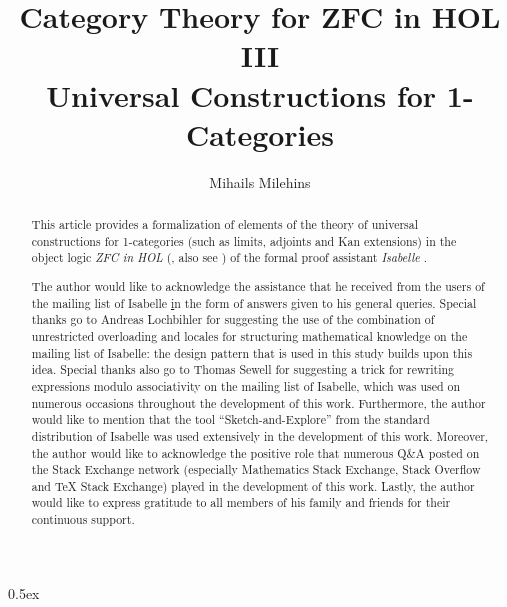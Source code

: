 \documentclass[11pt,a4paper,fleqn]{article}
\begin{document}
\title{Category Theory for ZFC in HOL III\\Universal Constructions for 1-Categories} 
\author{Mihails Milehins}
\maketitle

\newpage
\begin{abstract}
This article provides a formalization of elements of the theory of
universal constructions for 1-categories (such as limits,
adjoints and Kan extensions) in the object logic \textit{ZFC in HOL} 
(\cite{paulson_zermelo_2019}, also see \cite{barkaoui_partizan_2006}) of the 
formal proof assistant \textit{Isabelle} \cite{paulson_natural_1986}.
\end{abstract}

\newpage

\renewcommand{\abstractname}{Acknowledgements}
\begin{abstract}
The author would like to acknowledge the assistance that he received from 
the users of the mailing list of Isabelle 
\href{https://lists.cam.ac.uk/mailman/listinfo/cl-isabelle-users}
in the form of answers given to his general queries. Special thanks
go to Andreas Lochbihler for suggesting the use of the combination 
of unrestricted overloading and locales for structuring mathematical 
knowledge on the mailing list of Isabelle: the design pattern that is 
used in this study builds upon this idea. Special thanks also go to
Thomas Sewell for suggesting a trick for rewriting 
expressions modulo associativity on the mailing list of Isabelle,
which was used on numerous occasions throughout the development
of this work. Furthermore, the author
would like to mention that the tool ``Sketch-and-Explore''
\cite{haftmann_sketch-and-explore_2021}
from the standard distribution of Isabelle was used extensively in the
development of this work. Moreover, the author would like 
to acknowledge the positive role that numerous Q\&A posted on the 
Stack Exchange network (especially Mathematics Stack Exchange, 
Stack Overflow and TeX Stack Exchange)
played in the development of this work. 
Lastly, the author would like to express gratitude to all members of his family 
and friends for their continuous support.
\end{abstract}

\newpage

\tableofcontents

\newpage

\parindent 0pt\parskip 0.5ex



\newpage


\end{document}
